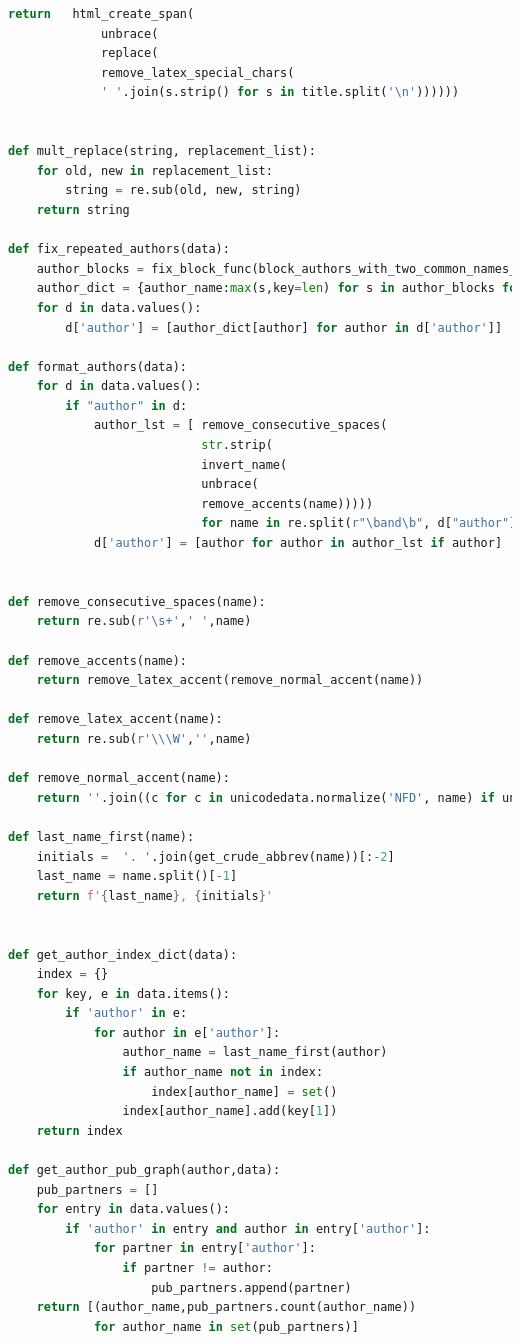 \documentclass[11pt,a4paper]{report}
\begin{document}
\begin{appendices}
\begin{lstlisting}[language=python]
    return   html_create_span(
             unbrace(
             replace(
             remove_latex_special_chars(
             ' '.join(s.strip() for s in title.split('\n'))))))


def mult_replace(string, replacement_list):
    for old, new in replacement_list:
        string = re.sub(old, new, string)
    return string

def fix_repeated_authors(data):
    author_blocks = fix_block_func(block_authors_with_two_common_names_v2(get_author_list(data)))
    author_dict = {author_name:max(s,key=len) for s in author_blocks for author_name in s}
    for d in data.values():
        d['author'] = [author_dict[author] for author in d['author']]

def format_authors(data):
    for d in data.values():
        if "author" in d:
            author_lst = [ remove_consecutive_spaces(
                           str.strip(
                           invert_name(
                           unbrace(
                           remove_accents(name)))))
                           for name in re.split(r"\band\b", d["author"].replace("\n", " "))]
            d['author'] = [author for author in author_lst if author]


def remove_consecutive_spaces(name):
    return re.sub(r'\s+',' ',name)

def remove_accents(name):
    return remove_latex_accent(remove_normal_accent(name))

def remove_latex_accent(name):
    return re.sub(r'\\\W','',name)

def remove_normal_accent(name):
    return ''.join((c for c in unicodedata.normalize('NFD', name) if unicodedata.category(c) != 'Mn'))

def last_name_first(name):
    initials =  '. '.join(get_crude_abbrev(name))[:-2]
    last_name = name.split()[-1]
    return f'{last_name}, {initials}'


def get_author_index_dict(data):
    index = {}
    for key, e in data.items():
        if 'author' in e:
            for author in e['author']:
                author_name = last_name_first(author)
                if author_name not in index:
                    index[author_name] = set()
                index[author_name].add(key[1])
    return index

def get_author_pub_graph(author,data):
    pub_partners = []
    for entry in data.values():
        if 'author' in entry and author in entry['author']:
            for partner in entry['author']:
                if partner != author:
                    pub_partners.append(partner)
    return [(author_name,pub_partners.count(author_name))
            for author_name in set(pub_partners)]


\end{lstlisting}
\end{appendices}
\end{document}

